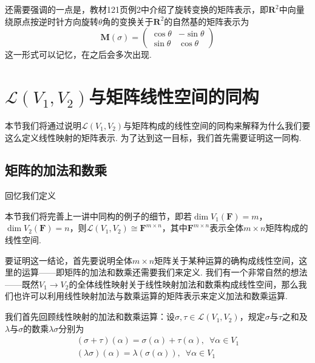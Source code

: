 还需要强调的一点是，教材121页例2中介绍了旋转变换的矩阵表示，即$\mathbf{R}^2$中向量绕原点按逆时针方向旋转$\theta$角的变换关于$\mathbf{R}^2$的自然基的矩阵表示为
\[\mathbf{M}(\sigma)=\begin{pmatrix}
        \cos\theta & -\sin\theta \\
        \sin\theta & \cos\theta
    \end{pmatrix}\]
这一形式可以记忆，在之后会多次出现.

\section{$\mathcal{L}(V_1,V_2)$与矩阵线性空间的同构}

本节我们将通过说明$\mathcal{L}(V_1,V_2)$与矩阵构成的线性空间的同构来解释为什么我们要这么定义线性映射的矩阵表示. 为了达到这一目标，我们首先需要证明这一同构.

\subsection{矩阵的加法和数乘}

回忆我们定义

本节我们将完善上一讲中同构的例子的细节，即若$\dim V_1(\mathbf{F})=m$，$\dim V_2(\mathbf{F})=n$，则$\mathcal{L}(V_1,V_2) \cong \mathbf{F}^{m \times n}$，其中$\mathbf{F}^{m \times n}$表示全体$m\times n$矩阵构成的线性空间.

要证明这一结论，首先要说明全体$m\times n$矩阵关于某种运算的确构成线性空间，这里的运算——即矩阵的加法和数乘还需要我们来定义. 我们有一个非常自然的想法——既然$V_1\to V_2$的全体线性映射关于线性映射加法和数乘构成线性空间，那么我们也许可以利用线性映射加法与数乘运算的矩阵表示来定义加法和数乘运算.

我们首先回顾线性映射的加法和数乘运算：设$\sigma,\tau\in \mathcal{L}(V_1,V_2)$，规定$\sigma$与$\tau$之和及$\lambda$与$\sigma$的数乘$\lambda\sigma$分别为
\begin{gather*}
    (\sigma+\tau)(\alpha)=\sigma(\alpha)+\tau(\alpha),\enspace\forall\alpha\in V_1 \\
    (\lambda\sigma)(\alpha)=\lambda(\sigma(\alpha)),\enspace\forall\alpha\in V_1
\end{gather*}

